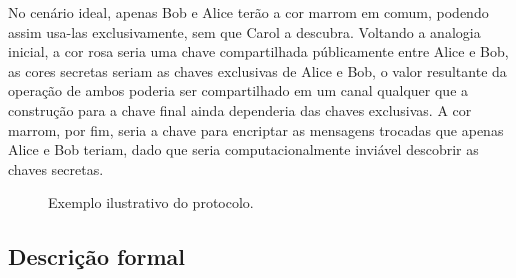 \documentclass{article}
\begin{document}
No cenário ideal, apenas Bob e Alice terão a cor marrom em comum, podendo assim
usa-las exclusivamente, sem que Carol a descubra. Voltando a analogia inicial,
a cor rosa seria uma chave compartilhada públicamente entre Alice e Bob, as
cores secretas seriam as chaves exclusivas de Alice e Bob, o valor resultante
da operação de ambos poderia ser compartilhado em um canal qualquer que a
construção para a chave final ainda dependeria das chaves exclusivas. A cor
marrom, por fim, seria a chave para encriptar as mensagens trocadas que apenas
Alice e Bob teriam, dado que seria computacionalmente inviável descobrir as
chaves secretas.


\begin{figure}[htpb]
    \centering
    
    \caption{Exemplo ilustrativo do protocolo.}%
    \label{fig:diagram}
\end{figure}

\subsection{Descrição formal}%
\label{sub:descricao_formal}





\end{document}
